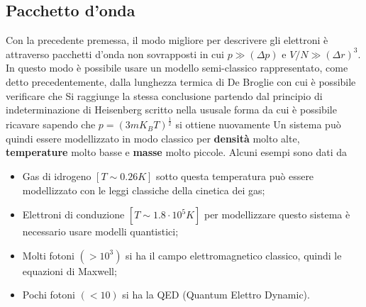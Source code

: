 \documentclass[a4paper,12pt]{article}
\begin{document}
\subsection{Pacchetto d'onda}
Con la precedente premessa, il modo migliore per descrivere gli elettroni è attraverso  pacchetti d'onda non sovrapposti in cui $p\gg (\Delta p)$ e  $V/N \gg (\Delta r)^3$. In questo modo  è possibile usare un modello semi-classico rappresentato, come detto precedentemente, dalla lunghezza termica di De Broglie
con cui è possibile verificare che 
Si raggiunge la stessa conclusione partendo dal principio di indeterminazione di Heisenberg scritto nella ususale forma
da cui è possibile ricavare
sapendo che $p=(3mK_BT)^{\frac{1}{2}}$ si ottiene nuovamente
Un sistema può quindi essere modellizzato in modo classico per \textbf{densità} molto alte, \textbf{temperature} molto basse e \textbf{masse} molto piccole. Alcuni esempi sono dati da
\begin{itemize}
	\item Gas di idrogeno $[T\sim 0.26 K]$ sotto questa temperatura può essere modellizzato con le leggi classiche della cinetica dei gas;
	\item Elettroni di conduzione $[T \sim 1.8\cdot 10^5K]$ per modellizzare questo sistema è necessario usare modelli quantistici;
	\item Molti fotoni $(>10^3)$ si ha il campo elettromagnetico classico, quindi le equazioni di Maxwell;
	\item Pochi fotoni $(<10)$ si ha la QED (Quantum Elettro Dynamic).
\end{itemize}
\end{document}
